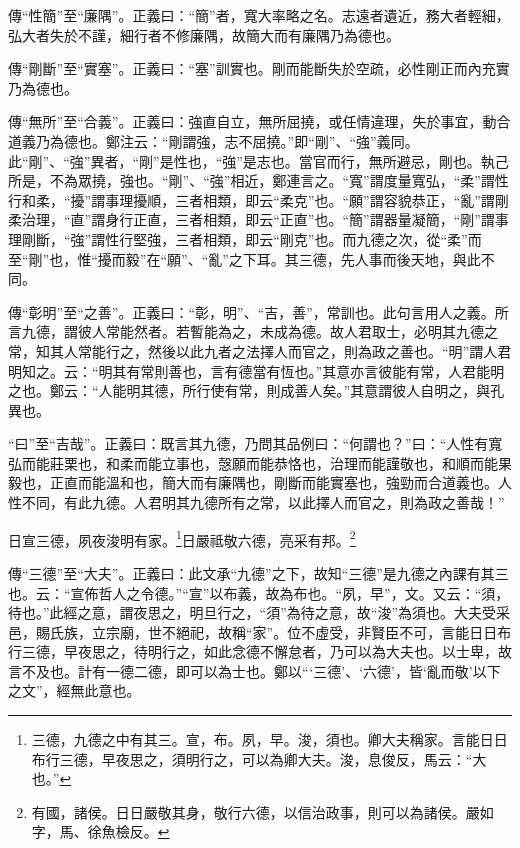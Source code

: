 {\noindent\zhuan{}\fzbyks 傳“性簡”至“廉隅”。正義曰：“簡”者，寬大率略之名。志遠者遺近，務大者輕細，弘大者失於不謹，細行者不修廉隅，故簡大而有廉隅乃為德也。 \par}

{\noindent\zhuan{}\fzbyks 傳“剛斷”至“實塞”。正義曰：“塞”訓實也。剛而能斷失於空疏，必性剛正而內充實乃為德也。 \par}

{\noindent\zhuan{}\fzbyks 傳“無所”至“合義”。正義曰：強直自立，無所屈撓，或任情違理，失於事宜，動合道義乃為德也。鄭注云：“剛謂強，志不屈撓。”即“剛”、“強”義同。此“剛”、“強”異者，“剛”是性也，“強”是志也。當官而行，無所避忌，剛也。執己所是，不為眾撓，強也。“剛”、“強”相近，鄭連言之。“寬”謂度量寬弘，“柔”謂性行和柔，“擾”謂事理擾順，三者相類，即云“柔克”也。“願”謂容貌恭正，“亂”謂剛柔治理，“直”謂身行正直，三者相類，即云“正直”也。“簡”謂器量凝簡，“剛”謂事理剛斷，“強”謂性行堅強，三者相類，即云“剛克”也。而九德之次，從“柔”而至“剛”也，惟“擾而毅”在“願”、“亂”之下耳。其三德，先人事而後天地，與此不同。 \par}

{\noindent\zhuan{}\fzbyks 傳“彰明”至“之善”。正義曰：“彰，明”、“吉，善”，常訓也。此句言用人之義。所言九德，謂彼人常能然者。若暫能為之，未成為德。故人君取士，必明其九德之常，知其人常能行之，然後以此九者之法擇人而官之，則為政之善也。“明”謂人君明知之。云：“明其有常則善也，言有德當有恆也。”其意亦言彼能有常，人君能明之也。鄭云：“人能明其德，所行使有常，則成善人矣。”其意謂彼人自明之，與孔異也。 \par}

{\noindent\shu{}\fzkt “曰”至“吉哉”。正義曰：既言其九德，乃問其品例曰：“何謂也？”曰：“人性有寬弘而能莊栗也，和柔而能立事也，愨願而能恭恪也，治理而能謹敬也，和順而能果毅也，正直而能溫和也，簡大而有廉隅也，剛斷而能實塞也，強勁而合道義也。人性不同，有此九德。人君明其九德所有之常，以此擇人而官之，則為政之善哉！” \par}

日宣三德，夙夜浚明有家。\footnote{三德，九德之中有其三。宣，布。夙，早。浚，須也。卿大夫稱家。言能日日布行三德，早夜思之，須明行之，可以為卿大夫。浚，息俊反，馬云：“大也。”}日嚴祗敬六德，亮采有邦。\footnote{有國，諸侯。日日嚴敬其身，敬行六德，以信治政事，則可以為諸侯。嚴如字，馬、徐魚檢反。}


{\noindent\zhuan{}\fzbyks 傳“三德”至“大夫”。正義曰：此文承“九德”之下，故知“三德”是九德之內課有其三也。云：“宣佈哲人之令德。”“宣”以布義，故為布也。“夙，早”，文。又云：“須，待也。”此經之意，謂夜思之，明旦行之，“須”為待之意，故“浚”為須也。大夫受采邑，賜氏族，立宗廟，世不絕祀，故稱“家”。位不虛受，非賢臣不可，言能日日布行三德，早夜思之，待明行之，如此念德不懈怠者，乃可以為大夫也。以士卑，故言不及也。計有一德二德，即可以為士也。鄭以“‘三德’、‘六德’，皆‘亂而敬’以下之文”，經無此意也。 \par}

